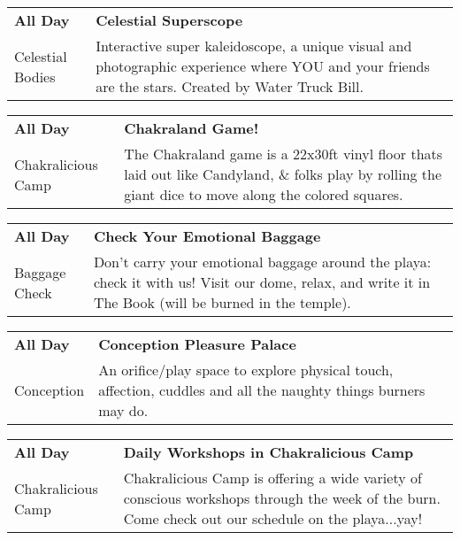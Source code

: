 \begin{tabular}{ p{1in} p{2.2in} }
    \textbf{All Day} & \textbf{Celestial Superscope} \\
    Celestial Bodies \newline  & Interactive super kaleidoscope, a unique visual and photographic experience where YOU and your friends are the stars. Created by Water Truck Bill. \\
    \hline 
\end{tabular}
    
\begin{tabular}{ p{1in} p{2.2in} }
    \textbf{All Day} & \textbf{Chakraland Game!} \\
    Chakralicious Camp \newline  & The Chakraland game is a 22x30ft vinyl floor thats laid out like Candyland, \& folks play by rolling the giant dice to move along the colored squares. \\
    \hline 
\end{tabular}
    
\begin{tabular}{ p{1in} p{2.2in} }
    \textbf{All Day} & \textbf{Check Your Emotional Baggage} \\
    Baggage Check \newline  & Don't carry your emotional baggage around the playa: check it with us! Visit our dome, relax, and write it in The Book (will be burned in the temple). \\
    \hline 
\end{tabular}
    
\begin{tabular}{ p{1in} p{2.2in} }
    \textbf{All Day} & \textbf{Conception Pleasure Palace} \\
    Conception \newline  & An orifice/play space to explore physical touch, affection, cuddles and all the naughty things burners may do. \\
    \hline 
\end{tabular}
    
\begin{tabular}{ p{1in} p{2.2in} }
    \textbf{All Day} & \textbf{Daily Workshops in Chakralicious Camp} \\
    Chakralicious Camp \newline  & Chakralicious Camp is offering a wide variety of conscious workshops through the week of the burn. Come check out our schedule on the playa...yay! \\
    \hline 
\end{tabular}
    

